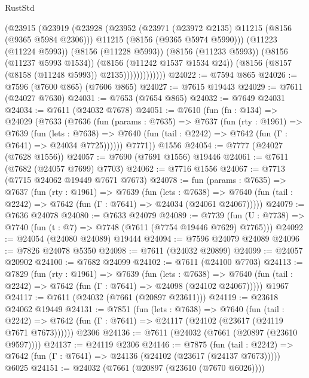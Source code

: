 \begin{lexlean}{RustStd}
\begin{coremodule}
                    (@23915
                      (@23919
                        (@23928
                          (@23952
                            (@23971 (@23972 @2135) @11215 (@8156 (@9365 @5984 @2306)))
                            @11215
                            (@8156 (@9365 @5974 @5990)))
                          (@11223 (@11224 @5993))
                          (@8156 (@11228 @5993))
                          (@8156 (@11233 @5993))
                          (@8156 (@11237 @5993 @1534))
                          (@8156 (@11242 @1537 @1534 @24))
                          (@8156 (@8157 (@8158 (@11248 @5993)) @2135)))))))))))))
@24022 := @7594 @865
@24026 := @7596 (@7600 @865) (@7606 @865)
@24027 := @7615 @19443
@24029 := @7611 (@24027 @7630)
@24031 := @7653 (@7654 @865)
@24032 := @7649 @24031
@24034 := @7611 (@24032 @7678)
@24051 := @7610
    (fun (fn : @134) =>
    @24029
      (@7633
        (@7636
          (fun (params : @7635) =>
          @7637
            (fun (rty : @1961) =>
            @7639
              (fun (lets : @7638) =>
              @7640 (fun (tail : @2242) => @7642 (fun (Γ : @7641) => @24034 @7725))))))
        @7771))
    @1556
@24054 := @7777 (@24027 (@7628 @1556))
@24057 := @7690 (@7691 @1556) @19446
@24061 := @7611 (@7682 (@24057 @7699) @7703)
@24062 := @7716 @1556
@24067 := @7713 (@7715 @24062 @19449 @7671 @7673)
@24078 := fun (params : @7635) =>
  @7637
    (fun (rty : @1961) =>
    @7639
      (fun (lets : @7638) =>
      @7640 (fun (tail : @2242) => @7642 (fun (Γ : @7641) => @24034 (@24061 @24067)))))
@24079 := @7636 @24078
@24080 := @7633 @24079
@24089 := @7739
    (fun (U : @7738) => @7740 (fun (t : @7) => @7748 (@7611 (@7754 @19446 @7629) @7765)))
@24092 := @24054 (@24080 @24089) @19444
@24094 := @7596 @24079 @24089
@24096 := @7826 @24078 @5350
@24098 := @7611 (@24032 @20899)
@24099 := @24057 @20902
@24100 := @7682 @24099
@24102 := @7611 (@24100 @7703)
@24113 := @7829
    (fun (rty : @1961) =>
    @7639
      (fun (lets : @7638) =>
      @7640 (fun (tail : @2242) => @7642 (fun (Γ : @7641) => @24098 (@24102 @24067)))))
    @1967
@24117 := @7611 (@24032 (@7661 (@20897 @23611)))
@24119 := @23618 @24062 @19449
@24131 := @7851
    (fun (lets : @7638) =>
    @7640
      (fun (tail : @2242) =>
      @7642 (fun (Γ : @7641) => @24117 (@24102 (@23617 (@24119 @7671 @7673))))))
    @2306
@24136 := @7611 (@24032 (@7661 (@20897 (@23610 @9597))))
@24137 := @24119 @2306
@24146 := @7875
    (fun (tail : @2242) => @7642 (fun (Γ : @7641) => @24136 (@24102 (@23617 (@24137 @7673)))))
    @6025
@24151 := @24032 (@7661 (@20897 (@23610 (@7670 @6026))))

\end{coremodule}
\end{lexlean}
